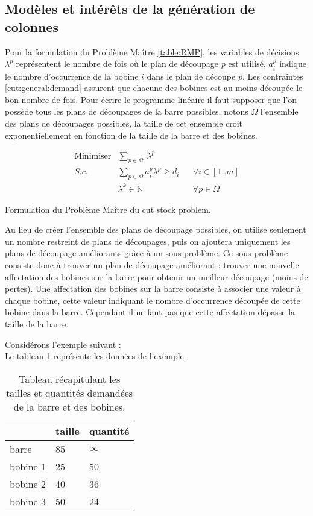 \subsection{Modèles et intérêts de la génération de colonnes}
Pour la formulation du Problème Maître \ref{table:RMP}, les variables de décisions $\lambda^p$ représentent le nombre de fois où le plan de découpage $p$ est utilisé, $a_{i}^p$ indique le nombre d’occurrence de la bobine $i$ dans le plan de découpe $p$.
Les contraintes \eqref{cut:general:demand} assurent que chacune des bobines est au moins découpée le bon nombre de fois. 
Pour écrire le programme linéaire il faut supposer que l'on possède tous les plans de découpages de la barre possibles, notons $\Omega$ l'ensemble des plans de découpages possibles, la taille de cet ensemble croit exponentiellement en fonction de la taille de la barre et des bobines.


\begin{table}[H]
\begin{align}
\text{Minimiser} &\sum\limits_{p\in \Omega}  ~ \lambda^p  \label{cut:general:obj}&&\\ 
S.c. & \sum\limits_{p\in\Omega}  a_{i}^p\lambda^{p} \geq d_i  && \forall i \in [1..m] \label{cut:general:demand}\\
& \lambda^k  \in \mathbb{N} && \forall p \in \Omega
\end{align}
\caption{Formulation du Problème Maître du cut stock problem. \label{table:RMP}}
\end{table}



Au lieu de créer l'ensemble des plans de découpage possibles, on utilise seulement un nombre restreint de plans de découpages, puis on ajoutera uniquement les plans de découpage améliorants grâce à un sous-problème.
Ce sous-problème consiste donc à trouver un plan de découpage améliorant : trouver une nouvelle affectation des bobines sur la barre pour obtenir un meilleur découpage (moins de pertes).
Une affectation des bobines sur la barre consiste à associer une valeur à chaque bobine, cette valeur indiquant le nombre d'occurrence découpée de cette bobine dans la barre.
Cependant il ne faut pas que cette affectation dépasse la taille de la barre.



Considérons l'exemple suivant : \\
Le tableau \ref{table:cutstock} représente les données de l'exemple.
\begin{table}[H]
\centering
\begin{tabular}{|l|l|l|}
\hline
 & taille & quantité\\
\hline
barre & 85 & $\infty$\\
bobine 1 & 25 & 50\\
bobine 2 & 40 & 36\\
bobine 3& 50 &24\\
\hline
\end{tabular}
\caption{Tableau récapitulant les tailles et quantités demandées de la barre et des bobines.\label{table:cutstock}}
\end{table}


